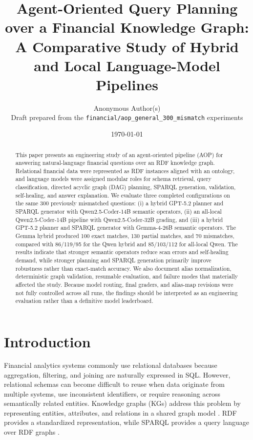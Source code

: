 \documentclass[11pt]{article}
\title{\textbf{Agent-Oriented Query Planning over a Financial Knowledge Graph:}\\
A Comparative Study of Hybrid and Local Language-Model Pipelines}
\author{Anonymous Author(s)\\
\small Draft prepared from the \texttt{financial/aop\_general\_300\_mismatch} experiments}
\date{\today}
\begin{document}
\maketitle

\begin{abstract}
This paper presents an engineering study of an agent-oriented pipeline (AOP) for answering natural-language financial questions over an RDF knowledge graph. Relational financial data were represented as RDF instances aligned with an ontology, and language models were assigned modular roles for schema retrieval, query classification, directed acyclic graph (DAG) planning, SPARQL generation, validation, self-healing, and answer explanation. We evaluate three completed configurations on the same 300 previously mismatched questions: (i) a hybrid GPT-5.2 planner and SPARQL generator with Qwen2.5-Coder-14B semantic operators, (ii) an all-local Qwen2.5-Coder-14B pipeline with Qwen2.5-Coder-32B grading, and (iii) a hybrid GPT-5.2 planner and SPARQL generator with Gemma-4-26B semantic operators. The Gemma hybrid produced 100 exact matches, 130 partial matches, and 70 mismatches, compared with 86/119/95 for the Qwen hybrid and 85/103/112 for all-local Qwen. The results indicate that stronger semantic operators reduce scan errors and self-healing demand, while stronger planning and SPARQL generation primarily improve robustness rather than exact-match accuracy. We also document alias normalization, deterministic graph validation, resumable evaluation, and failure modes that materially affected the study. Because model routing, final graders, and alias-map revisions were not fully controlled across all runs, the findings should be interpreted as an engineering evaluation rather than a definitive model leaderboard.
\end{abstract}

\section{Introduction}

Financial analytics systems commonly use relational databases because aggregation, filtering, and joining are naturally expressed in SQL. However, relational schemas can become difficult to reuse when data originate from multiple systems, use inconsistent identifiers, or require reasoning across semantically related entities. Knowledge graphs (KGs) address this problem by representing entities, attributes, and relations in a shared graph model \cite{hogan2021kg}. RDF provides a standardized representation, while SPARQL provides a query language over RDF graphs \cite{rdf11,sparql11}.
\end{document}
